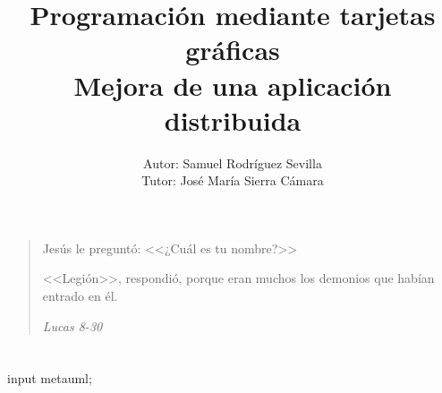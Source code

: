 \documentclass[12pt]{book}
\begin{document}
	
	\title{Programación mediante tarjetas gráficas\\Mejora de una aplicación distribuida}
	\author{Autor: Samuel Rodríguez Sevilla\\Tutor: José María Sierra Cámara}
	
	\maketitle
	
	\section*{}
	\pagebreak\newpage

	\vspace*{\fill}
	\begin{quote}
		Jesús le preguntó: <<¿Cuál es tu nombre?>>
		
		<<Legión>>, respondió, porque eran muchos los demonios que habían entrado en él.
		
		\emph{Lucas 8-30}
	\end{quote}
	\vspace*{\fill}
	
	\pagebreak\newpage
	\section*{}
	\pagebreak\newpage
	
	
	
	\tableofcontents
	\listoffigures
	\listoftables
	
	\begin{empfile}
	\begin{empcmds}
	input metauml;
	\end{empcmds}
	
	
	
	
	
	
	
	\appendix
	
	
	
	
	
	
	
	
	
	\end{empfile}
	
	
\end{document}
